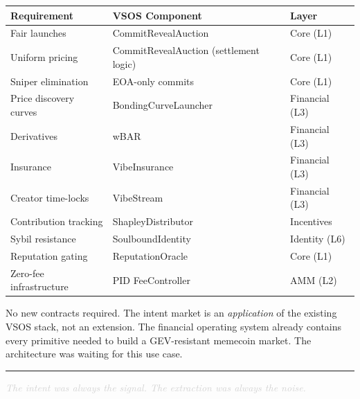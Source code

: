 \documentclass[9pt, letterpaper]{article}
\newcommand{\thinrule}{\vspace{2pt}\noindent\textcolor{rule}{\rule{\textwidth}{0.4pt}}\vspace{2pt}}
\begin{document}
\vspace{0.2em}
{\small
\renewcommand{\arraystretch}{1.1}
\begin{tabularx}{\textwidth}{@{} l l X @{}}
\toprule
\textbf{Requirement} & \textbf{VSOS Component} & \textbf{Layer} \\
\midrule
Fair launches & CommitRevealAuction & Core (L1) \\
Uniform pricing & CommitRevealAuction (settlement logic) & Core (L1) \\
Sniper elimination & EOA-only commits & Core (L1) \\
Price discovery curves & BondingCurveLauncher & Financial (L3) \\
Derivatives & wBAR & Financial (L3) \\
Insurance & VibeInsurance & Financial (L3) \\
Creator time-locks & VibeStream & Financial (L3) \\
Contribution tracking & ShapleyDistributor & Incentives \\
Sybil resistance & SoulboundIdentity & Identity (L6) \\
Reputation gating & ReputationOracle & Core (L1) \\
Zero-fee infrastructure & PID FeeController & AMM (L2) \\
\bottomrule
\end{tabularx}
}

\vspace{0.2em}
No new contracts required. The intent market is an \textit{application} of the existing VSOS stack, not an extension. The financial operating system already contains every primitive needed to build a GEV-resistant memecoin market. The architecture was waiting for this use case.

\thinrule

\begin{center}
\textcolor{lightgray}{\footnotesize\textit{The intent was always the signal. The extraction was always the noise.}}
\end{center}
\end{document}
